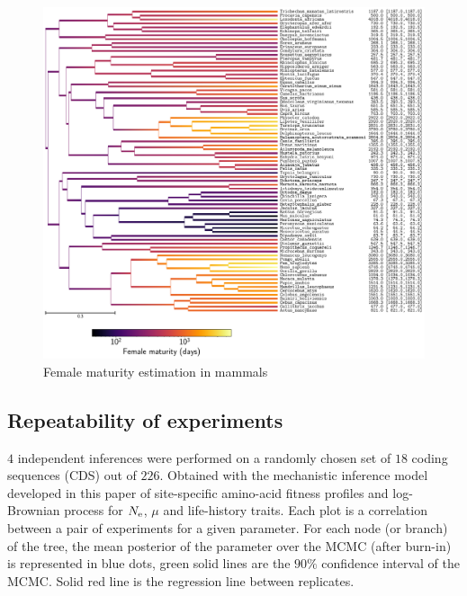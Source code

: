 \documentclass{article}
\begin{document}
	\begin{figure}[H]
		\centering
		\includegraphics[width=\linewidth, page=1]{mammals/18CDS_SiteMutSelBranchNe_R1_LogFemale_maturity}
		\caption[Female maturity estimation in mammals]{Female maturity estimation in mammals}
	\end{figure}

	\subsection{Repeatability of experiments}
	\label{subsec:repeatability-of-experiments-mammals}

	$4$ independent inferences were performed on a randomly chosen set of $18$ coding sequences ({CDS}) out of $226$.
	Obtained with the mechanistic inference model developed in this paper of site-specific amino-acid fitness profiles and log-Brownian process for $N_{\text{e}}$, $\mu$ and life-history traits.
	Each plot is a correlation between a pair of experiments for a given parameter.
	For each node (or branch) of the tree, the mean {posterior} of the parameter over the {MCMC} (after burn-in) is represented in blue dots, green solid lines are the $90\%$ confidence interval of the {MCMC}.
	Solid red line is the regression line between replicates.
\end{document}
